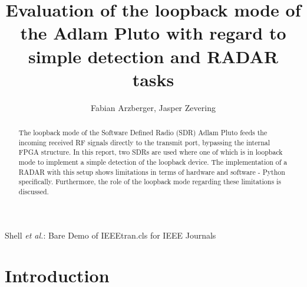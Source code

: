 \documentclass[journal]{IEEEtran}
\begin{document}
\title{Evaluation of the loopback mode of the Adlam Pluto with regard to simple detection and RADAR tasks }


\author{Fabian Arzberger,
        Jasper Zevering}


%
{Shell \MakeLowercase{\textit{et al.}}: Bare Demo of IEEEtran.cls for IEEE Journals}





\maketitle

\begin{abstract}
The loopback mode of the Software Defined Radio (SDR) Adlam Pluto feeds the incoming received RF signals directly to the transmit port, bypassing the internal FPGA structure.
In this report, two SDRs are used where one of which is in loopback mode to implement a simple detection of the loopback device.
The implementation of a RADAR with this setup shows limitations in terms of hardware and software - Python specifically.
Furthermore, the role of the loopback mode regarding these limitations is discussed.
\end{abstract}



\IEEEpeerreviewmaketitle


\section{Introduction}
\label{sec:introduction}
\end{document}
